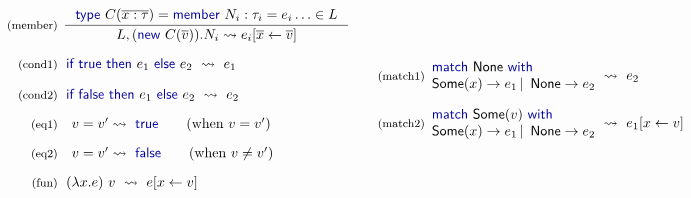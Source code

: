 \documentclass[10pt,nocopyrightspace]{sigplanconf}
\newcommand{\kvd}[1]{\textnormal{\textcolor{kvdclr}{\sffamily #1}}}
\newcommand{\ident}[1]{\textnormal{\sffamily #1}}
\newcommand{\reduce}{\rightsquigarrow}
\begin{document}
\begin{figure}
\vspace{0.5em}
\noindent
\begin{equation*}
\begin{array}{rl}
 \textnormal{\footnotesize{(member)}}&
 \hspace{-0.6em}
 \inference
 { \kvd{type}~C(\overline{x:\tau})= \kvd{member}~N_i : \tau_i = e_i \ldots \in L }
 { L, (\kvd{new}~C(\overline{v})).N_i \reduce e_i[\overline{x} \leftarrow \overline{v}] }\\
 \\[-0.2em]
 \textnormal{\footnotesize{(cond1)}}&
 \hspace{-0.4em}
 \kvd{if}~\kvd{true}~\kvd{then}~e_1~\kvd{else}~e_2 ~\reduce~ e_1 \\
 \\[-0.2em]
 \textnormal{\footnotesize{(cond2)}}&
 \hspace{-0.4em}
 \kvd{if}~\kvd{false}~\kvd{then}~e_1~\kvd{else}~e_2 ~\reduce~ e_2 \\
 \\[-0.3em]
 \textnormal{\footnotesize{(eq1)}}&
 v=v'\reduce\kvd{true} \qquad (\textnormal{when}~v = v')\\
 \\[-0.3em]
 \textnormal{\footnotesize{(eq2)}}&
 v=v'\reduce\kvd{false} \qquad (\textnormal{when}~v \neq v')\\
 \\[-0.3em]
 \textnormal{\footnotesize{(fun)}}&
 \hspace{-0.4em}
 (\lambda x.e)~v ~\reduce~ e[x\leftarrow v] \\
\end{array}
\quad
\begin{array}{rl}
 \textnormal{\footnotesize{(match1)}}&
 \hspace{-1em}
 \begin{array}{l}
  \kvd{match}~\ident{None}~\kvd{with} \\
  \ident{Some}(x) \rightarrow e_1 \,|\, \ident{None} \rightarrow e_2
 \end{array} \hspace{-0.5em} ~\reduce~ e_2 \\
 \\[-0.2em]
 \textnormal{\footnotesize{(match2)}}&
 \hspace{-1em}
 \begin{array}{l}
    \kvd{match}~\ident{Some}(v)~\kvd{with} \\
    \ident{Some}(x) \rightarrow e_1 \,|\, \ident{None} \rightarrow e_2
 \end{array} \hspace{-0.5em} ~\reduce~ e_1[x\leftarrow v]\\

\end{array}
\end{equation*}
\end{figure}
\end{document}
